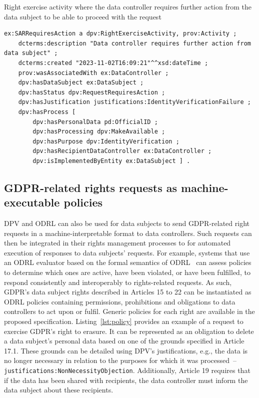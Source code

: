 \documentclass{IOS-Book-Article}     %
\begin{document}
\begin{listing}[ht]
\caption{Right exercise activity where the data controller requires further action from the data subject to be able to proceed with the request}
\label{lst:activity}
\begin{verbatim}
ex:SARRequiresAction a dpv:RightExerciseActivity, prov:Activity ;
    dcterms:description "Data controller requires further action from data subject" ;
    dcterms:created "2023-11-02T16:09:21"^^xsd:dateTime ;
    prov:wasAssociatedWith ex:DataController ;
    dpv:hasDataSubject ex:DataSubject ;
    dpv:hasStatus dpv:RequestRequiresAction ;
    dpv:hasJustification justifications:IdentityVerificationFailure ;
    dpv:hasProcess [
        dpv:hasPersonalData pd:OfficialID ;
        dpv:hasProcessing dpv:MakeAvailable ;
        dpv:hasPurpose dpv:IdentityVerification ;
        dpv:hasRecipientDataController ex:DataController ;
        dpv:isImplementedByEntity ex:DataSubject ] .
\end{verbatim}
\end{listing}

\subsection{GDPR-related rights requests as machine-executable policies}
\label{sec:policies}

DPV and ODRL can also be used for data subjects to send GDPR-related right requests in a machine-interpretable format to data controllers.
Such requests can then be integrated in their rights management processes to for automated execution of responses to data subjects' requests.
For example, systems that use an ODRL evaluator based on the formal semantics of ODRL~\cite{fornara_odrl_2024} can assess policies to determine which ones are active, have been violated, or have been fulfilled, to respond consistently and interoperably to rights-related requests.
As such, GDPR's data subject rights described in Articles 15 to 22 can be instantiated as ODRL policies containing permissions, prohibitions and obligations to data controllers to act upon or fulfil.
Generic policies for each right are available in the proposed specification.
Listing~\ref{lst:policy} provides an example of a request to exercise GDPR's right to erasure.
It can be represented as an obligation to delete a data subject's personal data based on one of the grounds specified in Article 17.1.
These grounds can be detailed using DPV's justifications, e.g., the data is no longer necessary in relation to the purposes for which it was processed~--\texttt{justifications:NonNecessityObjection}.
Additionally, Article 19 requires that if the data has been shared with recipients, the data controller must inform the data subject about these recipients.
\end{document}
